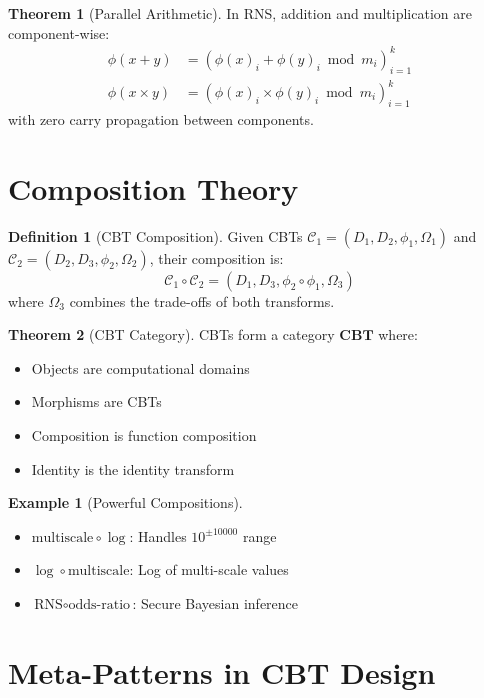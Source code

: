 \documentclass[12pt,a4paper]{article}
\theoremstyle{definition}
\newtheorem{definition}{Definition}
\newtheorem{theorem}{Theorem}
\newtheorem{example}{Example}
\begin{document}
\begin{theorem}[Parallel Arithmetic]
In RNS, addition and multiplication are component-wise:
\begin{align}
\phi(x + y) &= (\phi(x)_i + \phi(y)_i \bmod m_i)_{i=1}^k\\
\phi(x \times y) &= (\phi(x)_i \times \phi(y)_i \bmod m_i)_{i=1}^k
\end{align}
with zero carry propagation between components.
\end{theorem}

\section{Composition Theory}

\begin{definition}[CBT Composition]
Given CBTs $\mathcal{C}_1 = (D_1, D_2, \phi_1, \Omega_1)$ and $\mathcal{C}_2 = (D_2, D_3, \phi_2, \Omega_2)$, their composition is:
\begin{equation}
\mathcal{C}_1 \circ \mathcal{C}_2 = (D_1, D_3, \phi_2 \circ \phi_1, \Omega_3)
\end{equation}
where $\Omega_3$ combines the trade-offs of both transforms.
\end{definition}

\begin{theorem}[CBT Category]
CBTs form a category $\mathbf{CBT}$ where:
\begin{itemize}
\item Objects are computational domains
\item Morphisms are CBTs
\item Composition is function composition
\item Identity is the identity transform
\end{itemize}
\end{theorem}

\begin{example}[Powerful Compositions]
\begin{itemize}
\item $\text{multiscale} \circ \log$: Handles $10^{\pm 10000}$ range
\item $\log \circ \text{multiscale}$: Log of multi-scale values
\item $\text{RNS} \circ \text{odds-ratio}$: Secure Bayesian inference
\end{itemize}
\end{example}

\section{Meta-Patterns in CBT Design}
\end{document}
